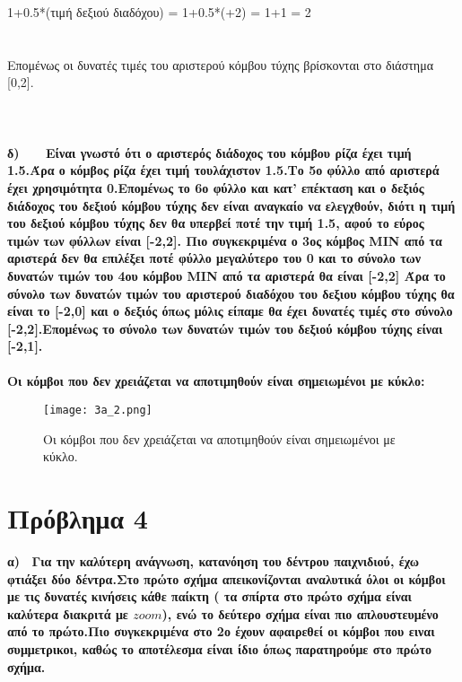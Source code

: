 \documentclass[10pt]{article}
\begin{document}
 \hspace{30mm}   1+0.5*(τιμή δεξιού διαδόχου) = 1+0.5*(+2) = 1+1 = 2
\\ \\ \\
Επομένως οι δυνατές τιμές του αριστερού κόμβου τύχης βρίσκονται στο διάστημα [0,2].\\ \\ \\ \\
\bf δ) \ \normalfont  \ \ 
Είναι γνωστό ότι ο αριστερός διάδοχος του κόμβου ρίζα έχει τιμή 1.5.Άρα ο κόμβος ρίζα έχει τιμή τουλάχιστον 1.5.Το 5ο φύλλο από αριστερά έχει χρησιμότητα 0.Επομένως το 6ο φύλλο και κατ’ επέκταση και ο δεξιός διάδοχος του δεξιού κόμβου τύχης δεν είναι αναγκαίο να ελεγχθούν, διότι η τιμή του δεξιού κόμβου τύχης δεν θα υπερβεί ποτέ την τιμή 1.5, αφού το εύρος τιμών των φύλλων είναι [-2,2].
Πιο συγκεκριμένα ο 3ος κόμβος ΜΙΝ από τα αριστερά δεν θα επιλέξει ποτέ φύλλο μεγαλύτερο του 0 και το σύνολο των δυνατών τιμών του 4ου κόμβου ΜΙΝ από τα αριστερά θα είναι [-2,2]
Άρα το σύνολο των δυνατών τιμών του αριστερού διαδόχου του δεξιου κόμβου τύχης θα είναι το [-2,0] και ο δεξιός όπως μόλις είπαμε θα έχει δυνατές τιμές στο σύνολο [-2,2].Επομένως το σύνολο των δυνατών τιμών του δεξιού κόμβου τύχης είναι [-2,1]. \\ \\
Οι κόμβοι που δεν χρειάζεται να αποτιμηθούν είναι σημειωμένοι με κύκλο:
\begin{figure}[H]
    \texttt{[image: 3a\_2.png]}\\
    \caption{Οι κόμβοι που δεν χρειάζεται να αποτιμηθούν είναι σημειωμένοι με κύκλο.}
\end{figure} 
\section*{Πρόβλημα 4}
\vspace{10mm}
\bf α) \ \normalfont  Για την καλύτερη ανάγνωση, κατανόηση του δέντρου παιχνιδιού, έχω φτιάξει δύο δέντρα.Στο πρώτο σχήμα απεικονίζονται αναλυτικά όλοι οι κόμβοι με τις δυνατές κινήσεις κάθε παίκτη ( τα σπίρτα στο πρώτο σχήμα είναι καλύτερα διακριτά με $zoom$), ενώ το δεύτερο σχήμα είναι πιο απλουστευμένο από το πρώτο.Πιο συγκεκριμένα στο 2ο έχουν αφαιρεθεί οι κόμβοι που ειναι συμμετρικοι, καθώς το αποτέλεσμα είναι ίδιο όπως παρατηρούμε στο πρώτο σχήμα. 
\vspace{10mm}
\end{document}
